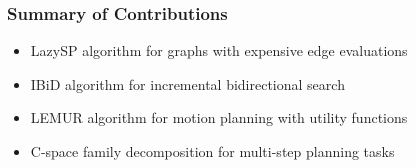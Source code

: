 \begin{frame}
   \frametitle{Summary of Contributions}

   \begin{itemize}
   \item LazySP algorithm for graphs with expensive edge evaluations
   \item IBiD algorithm for incremental bidirectional search
   \item LEMUR algorithm for motion planning with utility functions
   \item C-space family decomposition for multi-step planning tasks
   \end{itemize}



   
\end{frame}
